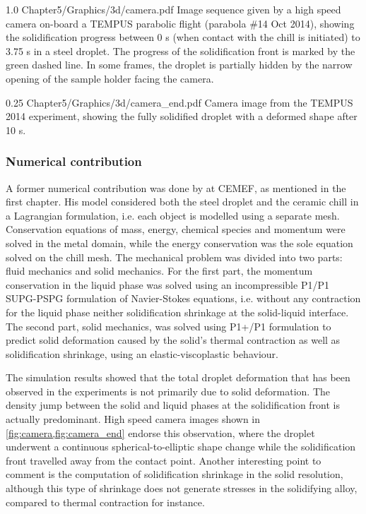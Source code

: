 \begin{figureth}
{1.0}
{Chapter5/Graphics/3d/camera.pdf}
{Image sequence given by a high speed camera on-board a TEMPUS parabolic flight (parabola \#14 Oct 2014), showing the 
solidification progress between 0 s (when contact with the chill is initiated) to 3.75 s in a  steel droplet. 
The progress of the solidification front is marked by the green dashed line. In some frames, the droplet is partially hidden by the narrow 
opening of the sample holder facing the camera.}
\label{fig:camera}
\end{figureth}

\begin{figureth}
{0.25}
{Chapter5/Graphics/3d/camera_end.pdf}
{Camera image from the TEMPUS 2014 experiment, showing the fully solidified droplet with a deformed shape after 10 s.}
\label{fig:camera_end}
\end{figureth}

\subsubsection{Numerical contribution}

A former numerical contribution was done by \citet{rivaux_simulation_2011} at CEMEF, as mentioned in the first chapter. 
His model considered both the steel droplet and the ceramic chill in a Lagrangian formulation, i.e. each object is
modelled using a separate mesh. Conservation equations of mass, energy,
chemical species and momentum were solved in the metal domain, while the energy
conservation was the sole equation solved on the chill mesh. The mechanical problem was divided
into two parts: fluid mechanics and solid mechanics. 
For the first part, the momentum conservation in the liquid phase was solved using an
incompressible P1/P1 SUPG-PSPG formulation of Navier-Stokes equations, i.e. 
without any contraction for the liquid phase neither solidification shrinkage at the solid-liquid interface.
The second part, solid mechanics, was solved using P1+/P1 formulation to predict solid deformation caused by the 
solid's thermal contraction as well as solidification shrinkage, 
using an elastic-viscoplastic behaviour. 

The simulation results showed that the total droplet deformation that has been
observed in the experiments is not primarily due to solid deformation. The density jump
between the solid and liquid phases at the solidification front is actually predominant. High
speed camera images shown in \cref{fig:camera,fig:camera_end} endorse this observation, where the droplet underwent a continuous
spherical-to-elliptic shape change while the solidification front travelled away from the
contact point. Another interesting point to comment is the computation of solidification
shrinkage in the solid resolution, although this type of shrinkage does not generate stresses 
in the solidifying alloy, compared to thermal contraction for instance.

